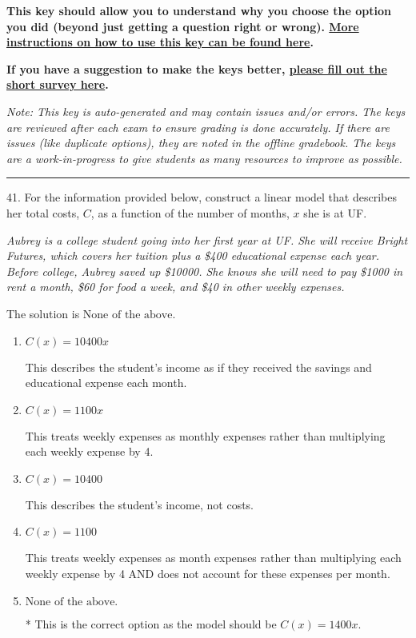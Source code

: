 \documentclass{article}[14pt]
\begin{document}
\textbf{This key should allow you to understand why you choose the option you did (beyond just getting a question right or wrong). \href{https://xronos.clas.ufl.edu/mac1105spring2020/courseDescriptionAndMisc/Exams/LearningFromResults}{More instructions on how to use this key can be found here}.}

\textbf{If you have a suggestion to make the keys better, \href{https://forms.gle/CZkbZmPbC9XALEE88}{please fill out the short survey here}.}

\textit{Note: This key is auto-generated and may contain issues and/or errors. The keys are reviewed after each exam to ensure grading is done accurately. If there are issues (like duplicate options), they are noted in the offline gradebook. The keys are a work-in-progress to give students as many resources to improve as possible.}

\rule{\textwidth}{0.4pt}

41. For the information provided below, construct a linear model that describes her total costs, $C$, as a function of the number of months, $x$ she is at UF. 
\begin{center} \textit{Aubrey is a college student going into her first year at UF. She will receive Bright Futures, which covers her tuition plus a \$400 educational expense each year. Before college, Aubrey saved up \$10000. She knows she will need to pay \$1000 in rent a month, \$60 for food a week, and \$40 in other weekly expenses.} \end{center} 
The solution is $ \text{None of the above.} $ 

\begin{enumerate}[label=\Alph*.] 
\item $ C(x) = 10400 x $ 

 This describes the student's income as if they received the savings and educational expense each month. 
\item $ C(x) = 1100 x $ 

 This treats weekly expenses as monthly expenses rather than multiplying each weekly expense by 4. 
\item $ C(x) = 10400 $ 

 This describes the student's income, not costs. 
\item $ C(x) = 1100 $ 

 This treats weekly expenses as month expenses rather than multiplying each weekly expense by 4 AND does not account for these expenses per month. 
\item $ \text{None of the above.} $ 

 * This is the correct option as the model should be $C(x) = 1400 x$. 
\end{enumerate} 
 
\end{document}
